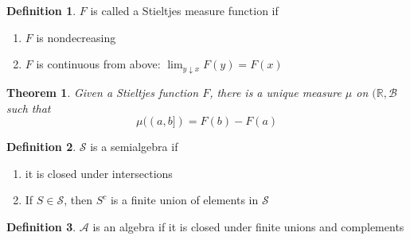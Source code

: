 \documentclass{article}
\newtheorem{theorem}{Theorem}
\theoremstyle{definition}
\newtheorem{definition}{Definition}
\newcommand{\Reals}{\mathbb{R}}
\newcommand{\Borel}{\mathcal{B}}
\begin{document}
\begin{definition}
    \(F\) is called a Stieltjes measure function if
    \begin{enumerate}
        \item \(F\) is nondecreasing
        \item \(F\) is continuous from above: \(\lim_{y \downarrow x} F(y) = F(x)\)
    \end{enumerate}
\end{definition}

\begin{theorem}
    Given a Stieltjes function \(F\), there is a unique measure \(\mu\) on \((\Reals, \Borel\) such that
    \[ \mu((a,b]) = F(b) - F(a) \]
\end{theorem}

\begin{definition}
    \(\mathcal S\) is a semialgebra if
    \begin{enumerate}
        \item it is closed under intersections
        \item If \(S\in \mathcal S\), then \(S^c\) is a finite union of elements in \(\mathcal S\)
    \end{enumerate}
\end{definition}

\begin{definition}
    \(\mathcal A\) is an algebra if it is closed under finite unions and complements
\end{definition}
\end{document}
